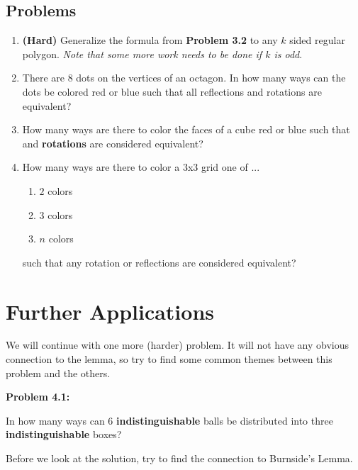 \documentclass[11pt]{scrartcl}
\begin{document}
\subsection{Problems}
\begin{enumerate}
    \item \textbf{(Hard)} Generalize the formula from \color{red} \textbf{Problem 3.2} \color{black} to any $k$ sided regular polygon. \textit{Note that some more work needs to be done if $k$ is odd}.
    \item There are $8$ dots on the vertices of an octagon. In how many ways can the dots be colored red or blue such that all reflections and rotations are equivalent?
    \item How many ways are there to color the faces of a cube red or blue such that and \color{blue} \textbf{rotations} \color{black} are considered equivalent?
    \item How many ways are there to color a $3$x$3$ grid one of ...
    \begin{enumerate}
        \item $2$ colors
        \item $3$ colors
        \item $n$ colors
    \end{enumerate}
    such that any rotation or reflections are considered equivalent?
\end{enumerate}

\section{Further Applications}

We will continue with one more (harder) problem. It will not have any obvious connection to the lemma, so try to find some common themes between this problem and the others.

\begin{tcolorbox}[colback=red!5!white,colframe=red!75!black]
  \color{red} \textbf{Problem 4.1:} \color{black}
  \vspace{0.1cm}
  
  In how many ways can $6$ \color{blue} \textbf{indistinguishable} \color{black} balls be distributed into three \color{blue} \textbf{indistinguishable} \color{black} boxes?
\end{tcolorbox}

Before we look at the solution, try to find the connection to Burnside's Lemma. 

\vspace{0.2cm}
\end{document}
